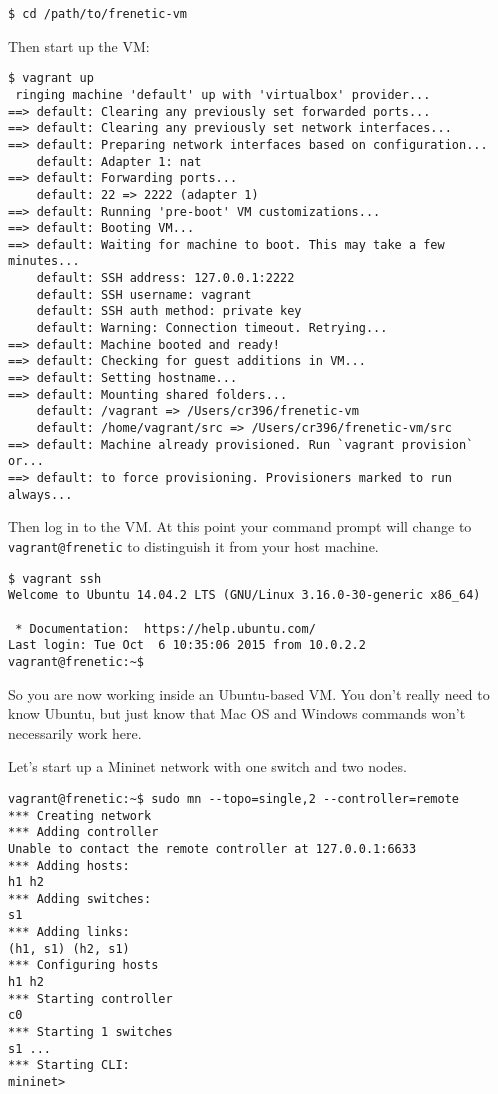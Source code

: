 \begin{lstlisting}[style=BashInputStyle]
 $ cd /path/to/frenetic-vm
\end{lstlisting}
 
Then start up the VM:

\begin{lstlisting}[style=BashInputStyle]
 $ vagrant up
 ringing machine 'default' up with 'virtualbox' provider...
==> default: Clearing any previously set forwarded ports...
==> default: Clearing any previously set network interfaces...
==> default: Preparing network interfaces based on configuration...
    default: Adapter 1: nat
==> default: Forwarding ports...
    default: 22 => 2222 (adapter 1)
==> default: Running 'pre-boot' VM customizations...
==> default: Booting VM...
==> default: Waiting for machine to boot. This may take a few minutes...
    default: SSH address: 127.0.0.1:2222
    default: SSH username: vagrant
    default: SSH auth method: private key
    default: Warning: Connection timeout. Retrying...
==> default: Machine booted and ready!
==> default: Checking for guest additions in VM...
==> default: Setting hostname...
==> default: Mounting shared folders...
    default: /vagrant => /Users/cr396/frenetic-vm
    default: /home/vagrant/src => /Users/cr396/frenetic-vm/src
==> default: Machine already provisioned. Run `vagrant provision` or...
==> default: to force provisioning. Provisioners marked to run always...
\end{lstlisting}

Then log in to the VM.  At this point your command prompt will change to {\tt vagrant@frenetic} to distinguish it
from your host machine.

\begin{lstlisting}[style=BashInputStyle]
 $ vagrant ssh
Welcome to Ubuntu 14.04.2 LTS (GNU/Linux 3.16.0-30-generic x86_64)

 * Documentation:  https://help.ubuntu.com/
Last login: Tue Oct  6 10:35:06 2015 from 10.0.2.2
vagrant@frenetic:~$ 
\end{lstlisting}

So you are now working inside an Ubuntu-based VM.  You don't really need to know Ubuntu, but just know that Mac OS and Windows commands won't necessarily work here.  

Let's start up a Mininet network with one switch and two nodes.

\begin{lstlisting}[style=BashInputStyle]
vagrant@frenetic:~$ sudo mn --topo=single,2 --controller=remote
*** Creating network
*** Adding controller
Unable to contact the remote controller at 127.0.0.1:6633
*** Adding hosts:
h1 h2
*** Adding switches:
s1
*** Adding links:
(h1, s1) (h2, s1)
*** Configuring hosts
h1 h2
*** Starting controller
c0
*** Starting 1 switches
s1 ...
*** Starting CLI:
mininet>
\end{lstlisting}

